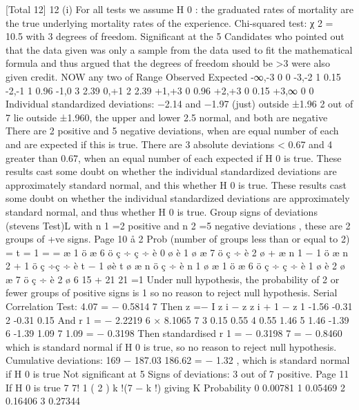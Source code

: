 \documentclass[a4paper,12pt]{article}
\begin{document}
[Total 12]
12
(i)
For all tests we assume H 0 : the graduated rates of mortality are the true
underlying mortality rates of the experience.
Chi-squared test: χ 2 = 10.5 with 3 degrees of freedom.
Significant at the 5%
Candidates who pointed out that the data given was only a sample from
the data used to fit the mathematical formula and thus argued that the
degrees of freedom should be >3 were also given credit.
NOW any two of
Range
Observed
Expected
-∞,-3
0
0
-3,-2
1
0.15
-2,-1
1
0.96
-1,0
3
2.39
0,+1
2
2.39
+1,+3
0
0.96
+2,+3
0
0.15
+3,∞
0
0
Individual standardized deviations: −2.14 and −1.97 (just) outside ±1.96
2 out of 7 lie outside ±1.960, the upper and lower 2.5%
normal, and both are negative
There are 2 positive and 5 negative deviations, when are equal number of
each and are expected if this is true.
There are 3 absolute deviations < 0.67 and 4 greater than 0.67, when an
equal number of each expected if H 0 is true.
These results cast some doubt on whether the individual standardized
deviations are approximately standard normal, and this whether H 0 is
true.
These results cast some doubt on whether the individual standardized
deviations are approximately standard normal, and thus whether H 0 is
true.
Group signs of deviations (stevens Test)L with n 1 =2 positive and n 2 =5
negative deviations , these are 2 groups of +ve signs.
Page 10%
å
2
Prob (number of groups less than or equal to 2) =
t = 1
=
=
æ 1 ö æ 6 ö
ç ÷ ç ÷
è 0 ø è 1 ø
æ 7 ö
ç ÷
è 2 ø
+
æ n 1 − 1 ö æ n 2 + 1 ö
ç
÷ç
÷
è t − 1 øè t ø
æ n ö
ç ÷
è n 1 ø
æ 1 ö æ 6 ö
ç ÷ ç ÷
è 1 ø è 2 ø
æ 7 ö
ç ÷
è 2 ø
6 15
+
21 21
=1
Under null hypothesis, the probability of 2 or fewer groups of positive
signs is 1 so no reason to reject null hypothesis.
Serial Correlation Test:
4.07
= − 0.5814
7
Then
z =−
I
z i − z
z i + 1 − z
1
-1.56
-0.31
2
-0.31
0.15
And r 1 =
− 2.2219
6 × 8.1065
7
3
0.15
0.55
4
0.55
1.46
5
1.46
-1.39
6
-1.39
1.09
7
1.09
= − 0.3198
Then standardised r 1 = − 0.3198 7 = − 0.8460
which is standard normal if H 0 is true, so no reason to reject null
hypothesis.
Cumulative deviations:
169 − 187.03
186.62
= − 1.32 , which is standard normal if H 0 is true
Not significant at 5%
Signs of deviations: 3 out of 7 positive.
Page 11%
If H 0 is true
7
7!
1
(
2 )
k !(7 − k !)
giving
K
Probability
0
0.00781
1
0.05469
2
0.16406
3
0.27344
\end{document}

